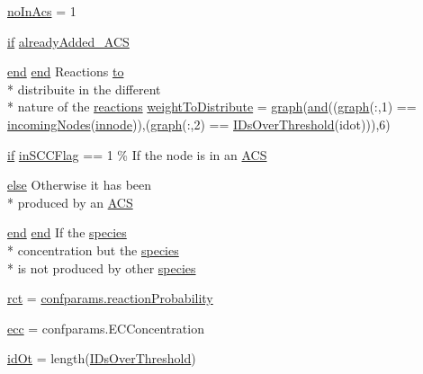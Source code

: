 \begin{DoxyCompactItemize}
\item 
\hyperlink{a00022_ac45b9c97670e4b4e103ce174dc2db6b3}{no\-In\-Acs} = 1
\item 
\hyperlink{a00024_a01d55766b8058903dd360b4bda71f9f5}{if} \hyperlink{a00022_a77c2cda04a3103708011753a77dceda3}{already\-Added\-\_\-\-A\-C\-S}
\item 
\hyperlink{a00019_afb358f48b1646c750fb9da6c6585be2b}{end} \hyperlink{a00019_afb358f48b1646c750fb9da6c6585be2b}{end} Reactions \hyperlink{a00022_af71dbe52628a3f83a77ab494817525c6}{to} \\*
distribuite in the different \\*
nature of the \hyperlink{a00015}{reactions} \hyperlink{a00022_a8f29aae1a516e7b27fa97f490490b59c}{weight\-To\-Distribute} = \hyperlink{a00022_a2745e24fec2a44d51f4452beb1596bd3}{graph}(\hyperlink{a00022_a170f8acb213f91bf71c77b1d20bceb33}{and}((\hyperlink{a00022_a2745e24fec2a44d51f4452beb1596bd3}{graph}(\-:,1) == \hyperlink{a00022_a34c98e3306059653f2a214e5ef975e9c}{incoming\-Nodes}(\hyperlink{a00022_a21f06040cb68a910280e04d4c59d980e}{innode})),(\hyperlink{a00022_a2745e24fec2a44d51f4452beb1596bd3}{graph}(\-:,2) == \hyperlink{a00022_a67c695f856b6731644c6a128e602a323}{I\-Ds\-Over\-Threshold}(idot))),6)
\item 
\hyperlink{a00024_a01d55766b8058903dd360b4bda71f9f5}{if} \hyperlink{a00022_af1605fa33751cda7e0c840d6df8f8a59}{in\-S\-C\-C\-Flag} == 1 \% If the node is in an \hyperlink{a00022_ad72e1068795c577213481e5db7f3e925}{A\-C\-S}
\item 
\hyperlink{a00025_af5946383720aa572eb93e1e63afc23c2}{else} Otherwise it has been \\*
produced by an \hyperlink{a00022_ad72e1068795c577213481e5db7f3e925}{A\-C\-S}
\item 
\hyperlink{a00019_afb358f48b1646c750fb9da6c6585be2b}{end} \hyperlink{a00019_afb358f48b1646c750fb9da6c6585be2b}{end} If the \hyperlink{a00016}{species} \\*
concentration but the \hyperlink{a00016}{species} \\*
is not produced by other \hyperlink{a00022_ad7a297e3111ffc45eba4a3b88590cb30}{species}
\item 
\hyperlink{a00022_a188d6e4d5a19aaeb1532fc5b9791afba}{rct} = \hyperlink{a00065_a9101beaeb03fddb5c6a9e68442177543}{confparams.\-reaction\-Probability}
\item 
\hyperlink{a00022_a4c229c44edda979d1be7b28b83e5e8b9}{ecc} = confparams.\-E\-C\-Concentration
\item 
\hyperlink{a00022_ad5352b3d09cda91b8c5f90532900abeb}{id\-Ot} = length(\hyperlink{a00022_a67c695f856b6731644c6a128e602a323}{I\-Ds\-Over\-Threshold})

\end{DoxyCompactItemize}
